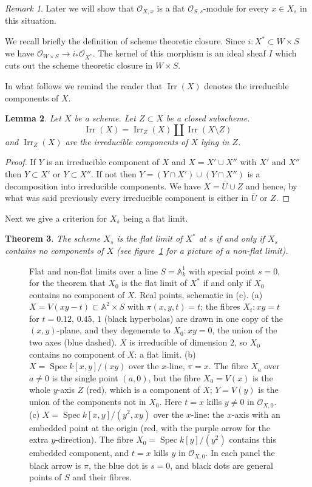 \documentclass[12pt]{article}
\numberwithin{equation}{section}
\newtheorem{theorem}{Theorem}[subsection]
\newtheorem{lemma}[theorem]{Lemma}
\theoremstyle{definition}
\theoremstyle{remark}
\newtheorem{remark}[theorem]{Remark}
\newcommand{\Ocal}{\mathcal{O}}
\renewcommand{\AA}{\mathbb{A}}
\newcommand{\Spec}{\operatorname{Spec}}
\newcommand{\Irr}{\operatorname{Irr}}
\begin{document}
\begin{remark}
	Later we will show that $\Ocal_{X,x}$ is a flat $\Ocal_{S,s}$-module for every $x\in X_s$ in this situation.
\end{remark}

We recall briefly the definition of scheme theoretic closure.
Since $i:X^* \subset W\times S$ we have $\Ocal_{W\times S} \to i_*\Ocal_{X^*}$.
The kernel of this morphism is an ideal sheaf $I$ which cuts out the scheme theoretic closure in $W\times S$. 



In what follows we remind the reader that $\Irr(X)$ denotes the irreducible components of $X$.
\begin{lemma}
	Let $X$ be a scheme. 
	Let $Z\subset X$ be a closed subscheme. 
	$$ \Irr(X) = \Irr_Z(X) \amalg \Irr(X\setminus Z)$$
	and $\Irr_Z(X)$ are the irreducible components of $X$ lying in $Z$.
\end{lemma}
\begin{proof}
	If $Y$ is an irreducible component of $X$ and $X = X' \cup X''$ with $X'$ and $X''$ then $Y \subset X'$ or $Y \subset X''$. 
	If not then $Y = (Y \cap X') \cup (Y \cap X'')$ is a decomposition into irreducible components. 
	We have $X = \overline{U} \cup Z$ and hence, by what was said previously every irreducible component is either in $\overline{U}$ or $Z$. 
\end{proof}

Next we give a criterion for $X_s$ being a flat limit. 

\begin{theorem}
	The scheme $X_s$ is the flat limit of $X^*$ at $s$ if and only if $X_s$ contains no components of $X$ (see figure~\ref{fig:flat-limit} for a picture of a non-flat limit).
\end{theorem}

\begin{figure}[H]
\centering

\caption{Flat and non-flat limits over a line $S=\AA^1_k$ with special point $s=0$, for the theorem that $X_0$ is the flat limit of $X^*$ if and only if $X_0$ contains no component of $X$. Real points, schematic in (c). (a) $X=V(xy-t)\subset\AA^2\times S$ with $\pi(x,y,t)=t$; the fibres $X_t\colon xy=t$ for $t=0.12,\,0.45,\,1$ (black hyperbolas) are drawn in one copy of the $(x,y)$-plane, and they degenerate to $X_0\colon xy=0$, the union of the two axes (blue dashed). $X$ is irreducible of dimension $2$, so $X_0$ contains no component of $X$: a flat limit. (b) $X=\Spec k[x,y]/(xy)$ over the $x$-line, $\pi=x$. The fibre $X_a$ over $a\neq0$ is the single point $(a,0)$, but the fibre $X_0=V(x)$ is the whole $y$-axis $Z$ (red), which is a component of $X$; $Y=V(y)$ is the union of the components not in $X_0$. Here $t=x$ kills $y\neq0$ in $\Ocal_{X,0}$. (c) $X=\Spec k[x,y]/(y^2,xy)$ over the $x$-line: the $x$-axis with an embedded point at the origin (red, with the purple arrow for the extra $y$-direction). The fibre $X_0=\Spec k[y]/(y^2)$ contains this embedded component, and $t=x$ kills $y$ in $\Ocal_{X,0}$. In each panel the black arrow is $\pi$, the blue dot is $s=0$, and black dots are general points of $S$ and their fibres.}\label{fig:flat-limit}
\end{figure}
\end{document}
